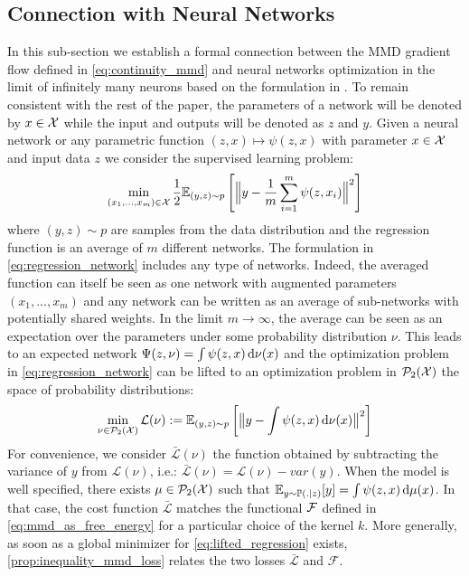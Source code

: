\subsection{Connection with Neural Networks}\label{subsec:training_neural_networks}
In this sub-section we establish a formal connection between the MMD gradient flow defined in \cref{eq:continuity_mmd} and neural networks optimization in the limit of infinitely many neurons based on the formulation in \cite{rotskoff2018neural}. To remain consistent with the rest of the paper, the parameters of a network will be denoted by $x\in {{\mathcal X}}$ while the input and outputs will be denoted as $z$ and $y$.
 Given a neural network or any parametric function $(z,x)\mapsto \psi(z,x)$ with parameter $x \in {{\mathcal X}} $ and input data $z$ we consider the supervised learning problem:
\begin{align}\label{eq:regression_network}
	\min_{(x_1,...,x_m )\in {{\mathcal X}}} \frac{1}{2}\mathbb{E}_{(y,z)\sim p  } \left[ \Big\Vert y - \frac{1}{m}\sum_{i=1}^m\psi(z,x_i) \Big\Vert^2 \right ]
\end{align}
where $(y,z) \sim p$ are samples from the data distribution and the regression function is an average of $m$ different networks. The formulation in \cref{eq:regression_network} includes any type of networks. Indeed, the averaged function can itself be seen as one network with augmented parameters $(x_1,...,x_m)$ and any network can be written as an average of sub-networks with potentially shared weights. In the limit $m\rightarrow \infty$, the average can be seen as an expectation over the parameters under some probability distribution $\nu$. This leads to an expected network $\Psi(z,\nu) =  \int \psi(z,x) \mathop{}\!\mathrm{d} \nu(x) $ and the optimization problem in \cref{eq:regression_network} can be lifted to an optimization problem in $\mathcal{P}_2({{\mathcal X}})$ the space of probability distributions:
\begin{align}\label{eq:lifted_regression}
	\min_{\nu \in \mathcal{P}_2({{\mathcal X}})}  \mathcal{L}(\nu) :=  \mathbb{E}_{(y,z)\sim p} \left [ \big\Vert y - \int \psi(z,x) \mathop{}\!\mathrm{d} \nu(x) \big\Vert^2 \right ]
\end{align} 
For convenience, we consider $\bar{\mathcal{L}}(\nu)$ the function obtained by subtracting the variance of $y$ from $\mathcal{L}(\nu)$, i.e.: $\bar{\mathcal{L}}(\nu) = \mathcal{L}(\nu) - var(y) $. When the model is well specified, there exists $\mu \in \mathcal{P}_2({{\mathcal X}}) $ such that $\mathbb{E}_{y\sim \mathbb{P}(.|z)}[y] =  \int \psi(z,x) \mathop{}\!\mathrm{d} \mu(x)$. In that case, the cost function $\bar{\mathcal{L}}$ matches  the functional ${{\mathcal F}}$ defined in \cref{eq:mmd_as_free_energy}  for a particular choice of the kernel $k$. More generally, as soon as a global minimizer for  \cref{eq:lifted_regression} exists,  \cref{prop:inequality_mmd_loss} relates the two losses $\bar{\mathcal{L}}$ and $\mathcal{F}$.
